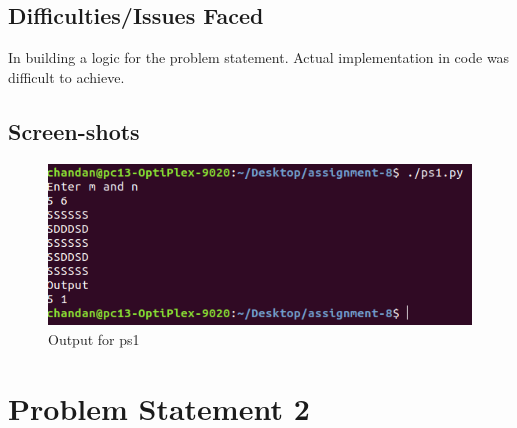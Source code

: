 \documentclass[a4paper,12pt]{article}
\begin{document}
	\subsection{Difficulties/Issues Faced}
	In building a logic for the problem statement. Actual implementation in code was difficult to achieve.
	

	\newpage
	\subsection{Screen-shots}
	
	
		\begin{figure}[h]
		\includegraphics[scale=0.7]{ps1.png}
		\caption{Output for ps1}
		\label{fig:ps1_1}
		\end{figure}
	

	
	\newpage
	
	\section{Problem Statement 2}

	
\end{document}
